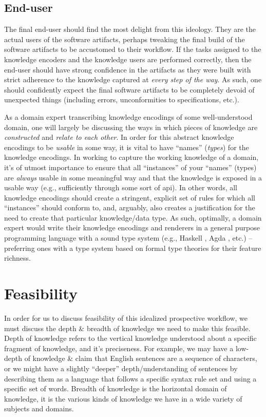 \subsection{End-user}

The final end-user should find the most delight from this ideology. They are the
actual users of the software artifacts, perhaps tweaking the final build of the
software artifacts to be accustomed to their workflow. If the tasks assigned to
the knowledge encoders and the knowledge users are performed correctly, then the
end-user should have strong confidence in the artifacts as they were built with
strict adherence to the knowledge captured at \textit{every step of the way}. As
such, one should confidently expect the final software artifacts to be
completely devoid of unexpected things (including errors, unconformities to
specifications, etc.).

As a domain expert transcribing knowledge encodings of some well-understood
domain, one will largely be discussing the ways in which pieces of knowledge are
\textit{constructed} and \textit{relate to each other}. In order for this
abstract knowledge encodings to be \textit{usable} in some way, it is vital to
have ``names'' (\textit{types}) for the knowledge encodings. In working to
capture the working knowledge of a domain, it's of utmost importance to ensure
that all ``instances'' of your ``names'' (types) are \textit{always} usable in
some meaningful way and that the knowledge is exposed in a usable way (e.g.,
sufficiently through some sort of \acs{api}). In other words, all knowledge
encodings should create a stringent, explicit set of rules for which all
``instances'' should conform to, and, arguably, also creates a justification for
the need to create that particular knowledge/data type. As such, optimally, a
domain expert would write their knowledge encodings and renderers in a general
purpose programming language with a sound type system (e.g., Haskell
\cite{Haskell2010}, Agda \cite{Norell2007}, etc.) -- preferring ones with a type
system based on formal type theories for their feature richness.

\section{Feasibility}
\label{sec:idlgy:feasibility}

In order for us to discuss feasibility of this idealized prospective workflow,
we must discuss the depth \& breadth of knowledge we need to make this feasible.
Depth of knowledge refers to the vertical knowledge understood about a specific
fragment of knowledge, and it's preciseness. For example, we may have a
low-depth of knowledge \& claim that English sentences are a sequence of
characters, or we might have a slightly ``deeper'' depth/understanding  of
sentences by describing them as a language that follows a specific syntax rule
set and using a specific set of words. Breadth of knowledge is the horizontal
domain of knowledge, it is the various kinds of knowledge we have in a wide
variety of subjects and domains.

